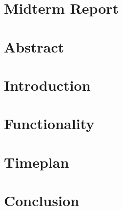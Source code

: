 \section*{Midterm Report}


\section{Abstract}
\newpage
\tableofcontents
\newpage

\section{Introduction}

\section{Functionality}

\section{Timeplan}

\section{Conclusion}



